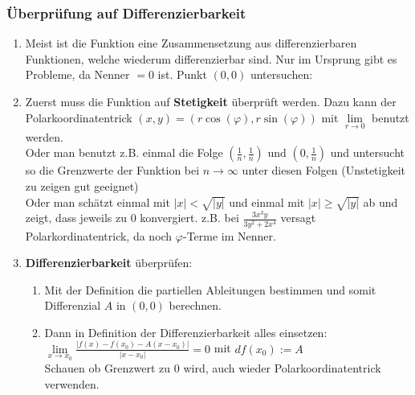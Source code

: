 \documentclass[a3paper, 11pt, landscape]{scrartcl}
\begin{document}
\begin{multicols*}{3}
	\subsubsection{Überprüfung auf Differenzierbarkeit}
	\begin{enumerate}
	    \item Meist ist die Funktion eine Zusammensetzung aus differenzierbaren Funktionen, welche wiederum differenzierbar sind. Nur im Ursprung gibt es Probleme, da Nenner $=0$ ist. Punkt $(0,0)$ untersuchen:
	    \item Zuerst muss die Funktion auf \textbf{Stetigkeit} überprüft werden. Dazu kann der Polarkoordinatentrick $(x,y)=(r\cos(\varphi),r\sin(\varphi))$ mit $\lim\limits_{r\to 0}$ benutzt werden.\\
	    Oder man benutzt z.B. einmal die Folge $(\frac{1}{n},\frac{1}{n})$ und $(0,\frac{1}{n})$ und untersucht so die Grenzwerte der Funktion bei $n\to\infty$ unter diesen Folgen (Unstetigkeit zu zeigen gut geeignet)\\
	    Oder man schätzt einmal mit $|x|<\sqrt{|y|}$ und einmal mit $|x|\geq \sqrt{|y|}$ ab und zeigt, dass jeweils zu 0 konvergiert. z.B. bei $\frac{3 x^{3} y}{3 y^{2}+2 x^{4}}$ versagt Polarkordinatentrick, da noch $\varphi$-Terme im Nenner.
	    \item \textbf{Differenzierbarkeit} überprüfen:
	    \begin{enumerate}
	        \item  Mit der Definition die partiellen Ableitungen bestimmen und somit Differenzial $A$ in $(0,0)$ berechnen.
	        \item Dann in Definition der Differenzierbarkeit alles einsetzen: $\lim\limits_{x\to x_0} \frac{|f(x)-f(x_0) - A(x-x_0)|}{|x-x_0|}=0$ mit $df(x_0):=A$ \\
	        Schauen ob Grenzwert zu 0 wird, auch wieder Polarkoordinatentrick verwenden.
	    \end{enumerate}
	    

\end{enumerate}
\end{multicols*}
\end{document}
